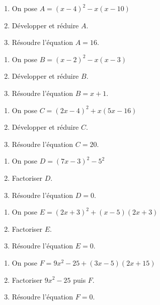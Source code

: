 \begin{multicols}{2}
    \begin{enumerate}
        \item On pose $A=(x-4)^2-x(x-10)$
        \item Développer et réduire $A$.
        \item Résoudre l'équation $A=16$.
    \end{enumerate}

    \begin{enumerate}
        \item On pose $B=(x-2)^2-x(x-3)$
        \item Développer et réduire $B$.
        \item Résoudre l'équation $B=x+1$.
    \end{enumerate}

    \begin{enumerate}
        \item On pose $C=(2x-4)^2+x(5x-16)$
        \item Développer et réduire $C$.
        \item Résoudre l'équation $C=20$.
    \end{enumerate}

    \begin{enumerate}
        \item On pose $D=(7x-3)^2-5^2$
        \item Factoriser $D$.
        \item Résoudre l'équation $D=0$.
    \end{enumerate}
    \columnbreak

    \begin{enumerate}
        \item On pose $E=(2x+3)^2+(x-5)(2x+3)$
        \item Factoriser $E$.
        \item Résoudre l'équation $E=0$.
    \end{enumerate}

    \begin{enumerate}
        \item On pose $F=9x^2-25+(3x-5)(2x+15)$
        \item Factoriser $9x^2-25$ puis $F$.
        \item Résoudre l'équation $F=0$.
    \end{enumerate}


\end{multicols}
